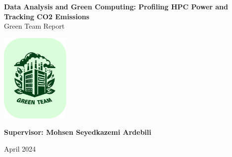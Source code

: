 \begin{titlepage}
    \begin{center}
    {\fontsize{25}{30}\selectfont \bfseries Data Analysis and Green Computing: Profiling HPC Power and Tracking CO2 Emissions} 
    \\\vspace{20pt}
    {\LARGE Green Team Report} \\
    \vspace{20pt}
    
    \vfill %

        \includegraphics[width=0.25\textwidth]{Logo/GreenTeam_Logo2.png}

        \vfill %
        \textbf{Supervisor: Mohsen Seyedkazemi Ardebili}

        April 2024
    \end{center}
\end{titlepage}